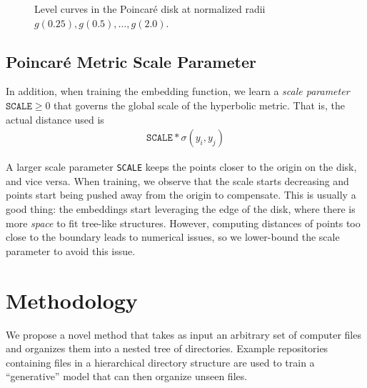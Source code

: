 \documentclass{article}
\begin{document}
\begin{figure}[H]
  \centering
  \caption{Level curves in the Poincaré disk at normalized radii $g(0.25), g(0.5), \dots, g(2.0)$.}
  \label{fig:poincare-level-curves}
\end{figure}

\subsection{Poincaré Metric Scale Parameter}

In addition, when training the embedding function, we learn a \emph{scale parameter} $\texttt{SCALE} \geq 0$ that governs the global scale of the hyperbolic metric. That is, the actual distance used is
\begin{align}
  \texttt{SCALE} * \sigma(y_i, y_j)
\end{align}

A larger scale parameter \texttt{SCALE} keeps the points closer to the origin on the disk, and vice versa. When training, we observe that the scale starts decreasing and points start being pushed away from the origin to compensate. This is usually a good thing: the embeddings start leveraging the edge of the disk, where there is more \emph{space} to fit tree-like structures. However, computing distances of points too close to the boundary leads to numerical issues, so we lower-bound the scale parameter to avoid this issue.

\section{Methodology}

We propose a novel method that takes as input an arbitrary set of computer files and organizes them into a nested tree of directories. Example repositories containing files in a hierarchical directory structure are used to train a ``generative'' model that can then organize unseen files.
\end{document}
